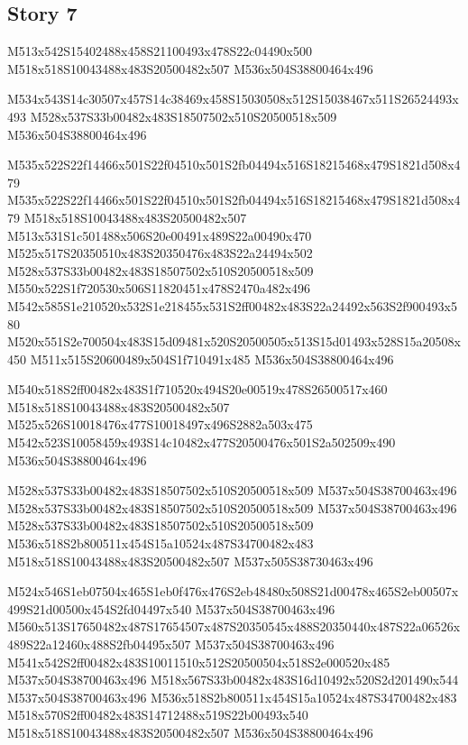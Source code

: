 \documentclass{article}
\begin{document}
\subsection{Story 7}

\begin{multicols}{5}
\begin{center}
M513x542S15402488x458S21100493x478S22c04490x500 %
M518x518S10043488x483S20500482x507 %
M536x504S38800464x496 %

M534x543S14c30507x457S14c38469x458S15030508x512S15038467x511S26524493x493 %
M528x537S33b00482x483S18507502x510S20500518x509 %
M536x504S38800464x496 %

M535x522S22f14466x501S22f04510x501S2fb04494x516S18215468x479S1821d508x479 %
M535x522S22f14466x501S22f04510x501S2fb04494x516S18215468x479S1821d508x479 %
M518x518S10043488x483S20500482x507 %
M513x531S1c501488x506S20e00491x489S22a00490x470 %
M525x517S20350510x483S20350476x483S22a24494x502 %
M528x537S33b00482x483S18507502x510S20500518x509 %
M550x522S1f720530x506S11820451x478S2470a482x496 %
M542x585S1e210520x532S1e218455x531S2ff00482x483S22a24492x563S2f900493x580 %
M520x551S2e700504x483S15d09481x520S20500505x513S15d01493x528S15a20508x450 %
M511x515S20600489x504S1f710491x485 %
M536x504S38800464x496 %

M540x518S2ff00482x483S1f710520x494S20e00519x478S26500517x460 %
M518x518S10043488x483S20500482x507 %
M525x526S10018476x477S10018497x496S2882a503x475 %
M542x523S10058459x493S14c10482x477S20500476x501S2a502509x490 %
M536x504S38800464x496 %

M528x537S33b00482x483S18507502x510S20500518x509 %
M537x504S38700463x496 %
M528x537S33b00482x483S18507502x510S20500518x509 %
M537x504S38700463x496 %
M528x537S33b00482x483S18507502x510S20500518x509 %
M536x518S2b800511x454S15a10524x487S34700482x483 %
M518x518S10043488x483S20500482x507 %
M537x505S38730463x496 %

M524x546S1eb07504x465S1eb0f476x476S2eb48480x508S21d00478x465S2eb00507x499S21d00500x454S2fd04497x540 %
M537x504S38700463x496 %
M560x513S17650482x487S17654507x487S20350545x488S20350440x487S22a06526x489S22a12460x488S2fb04495x507 %
M537x504S38700463x496 %
M541x542S2ff00482x483S10011510x512S20500504x518S2e000520x485 %
M537x504S38700463x496 %
M518x567S33b00482x483S16d10492x520S2d201490x544 %
M537x504S38700463x496 %
M536x518S2b800511x454S15a10524x487S34700482x483 %
M518x570S2ff00482x483S14712488x519S22b00493x540 %
M518x518S10043488x483S20500482x507 %
M536x504S38800464x496 %


\end{center}
\end{multicols}
\end{document}
